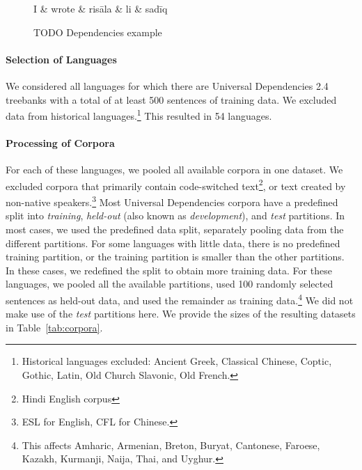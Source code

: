 \begin{figure}
\centering
\begin{dependency}[theme = simple]
   \begin{deptext}[column sep=1em]
	   I \&	   wrote \& risāla \& li \& sadīq  \\
   \end{deptext}
\end{dependency}
	\caption{TODO Dependencies example}\label{fig:dependency}
\end{figure}

\paragraph{Selection of Languages}
We considered all languages for which there are Universal Dependencies 2.4 treebanks with a total of at least 500 sentences of training data.
We excluded data from historical languages.\footnote{Historical languages excluded: Ancient Greek, Classical Chinese, Coptic, Gothic, Latin, Old Church Slavonic, Old French.}
This resulted in 54 languages.

\paragraph{Processing of Corpora}
For each of these languages, we pooled all available corpora in one dataset.
We excluded corpora that primarily contain code-switched text\footnote{Hindi English corpus}, or text created by non-native speakers.\footnote{ESL for English, CFL for Chinese.}
Most Universal Dependencies corpora have a predefined split into \emph{training}, \emph{held-out} (also known as \emph{development}), and \emph{test} partitions.
In most cases, we used the predefined data split, separately pooling data from the different partitions. 
For some languages with little data, there is no predefined training partition, or the training partition is smaller than the other partitions.
In these cases, we redefined the split to obtain more training data.
For these languages, we pooled all the available partitions, used 100 randomly selected sentences as held-out data, and used the remainder as training data.\footnote{This affects Amharic, Armenian, Breton, Buryat, Cantonese, Faroese, Kazakh, Kurmanji, Naija, Thai, and Uyghur.}
We did not make use of the \textit{test} partitions here.
We provide the sizes of the resulting datasets in Table~\ref{tab:corpora}.

